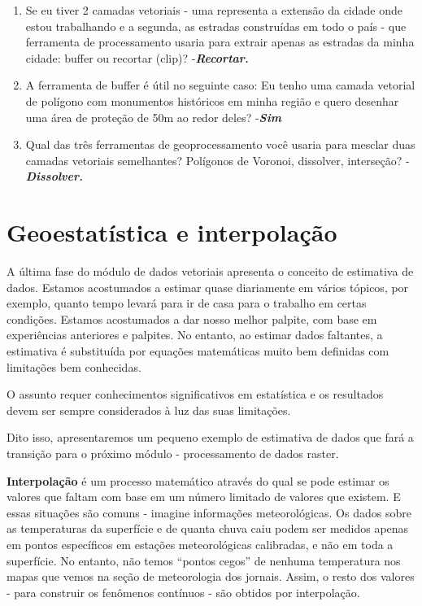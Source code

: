 \documentclass[
]{krantz}
\begin{document}
\begin{enumerate}
\def\labelenumi{\arabic{enumi}.}
\item
  Se eu tiver 2 camadas vetoriais - uma representa a extensão da cidade onde estou trabalhando e a segunda, as estradas construídas em todo o país - que ferramenta de processamento usaria para extrair apenas as estradas da minha cidade: buffer ou recortar (clip)? -\textbf{\emph{Recortar.}}
\item
  A ferramenta de buffer é útil no seguinte caso: Eu tenho uma camada vetorial de polígono com monumentos históricos em minha região e quero desenhar uma área de proteção de 50m ao redor deles? -\textbf{\emph{Sim}}
\item
  Qual das três ferramentas de geoprocessamento você usaria para mesclar duas camadas vetoriais semelhantes? Polígonos de Voronoi, dissolver, interseção? -\textbf{\emph{Dissolver.}}
\end{enumerate}

\hypertarget{geoestatuxedstica-e-interpolauxe7uxe3o}{%
\section{Geoestatística e interpolação}\label{geoestatuxedstica-e-interpolauxe7uxe3o}}

A última fase do módulo de dados vetoriais apresenta o conceito de estimativa de dados. Estamos acostumados a estimar quase diariamente em vários tópicos, por exemplo, quanto tempo levará para ir de casa para o trabalho em certas condições. Estamos acostumados a dar nosso melhor palpite, com base em experiências anteriores e palpites. No entanto, ao estimar dados faltantes, a estimativa é substituída por equações matemáticas muito bem definidas com limitações bem conhecidas.

O assunto requer conhecimentos significativos em estatística e os resultados devem ser sempre considerados à luz das suas limitações.

Dito isso, apresentaremos um pequeno exemplo de estimativa de dados que fará a transição para o próximo módulo - processamento de dados raster.

\textbf{Interpolação} é um processo matemático através do qual se pode estimar os valores que faltam com base em um número limitado de valores que existem. E essas situações são comuns - imagine informações meteorológicas. Os dados sobre as temperaturas da superfície e de quanta chuva caiu podem ser medidos apenas em pontos específicos em estações meteorológicas calibradas, e não em toda a superfície. No entanto, não temos ``pontos cegos'' de nenhuma temperatura nos mapas que vemos na seção de meteorologia dos jornais. Assim, o resto dos valores - para construir os fenômenos contínuos - são obtidos por interpolação.
\end{document}
